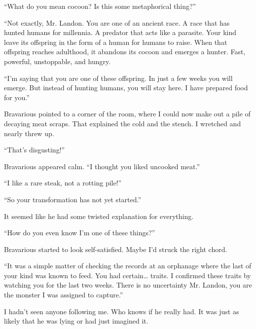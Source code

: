 ``What do you mean cocoon? Is this some metaphorical
thing?''



``Not exactly, Mr. Landon. You are one of an ancient race. A
race that has hunted humans for millennia. A predator that acts
like a parasite. Your kind leave its offspring in the form of a
human for humans to raise. When that offspring reaches adulthood,
it abandons its cocoon and emerges a hunter. Fast, powerful,
unstoppable, and hungry.



``I'm saying that you are one of these offspring. In just a
few weeks you will emerge. But instead of hunting humans, you will
stay here. I have prepared food for you.''



Bravarious pointed to a corner of the room, where I could now make
out a pile of decaying meat scraps. That explained the cold and the
stench. I wretched and nearly threw up.



``That's disgusting!''



Bravarious appeared calm. ``I thought you liked uncooked
meat.''



``I like a rare steak, not a rotting pile!''



``So your transformation has not yet started.''



It seemed like he had some twisted explanation for
everything.



``How do you even know I'm one of these
things?''



Bravarious started to look self-satisfied. Maybe I'd struck
the right chord.



``It was a simple matter of checking the records at an
orphanage where the last of your kind was known to feed. You had
certain{\ldots} traits. I confirmed these traits by watching you
for the last two weeks. There is no uncertainty Mr. Landon, you are
the monster I was assigned to capture.''



I hadn't seen anyone following me. Who knows if he really
had. It was just as likely that he was lying or had just imagined
it.




